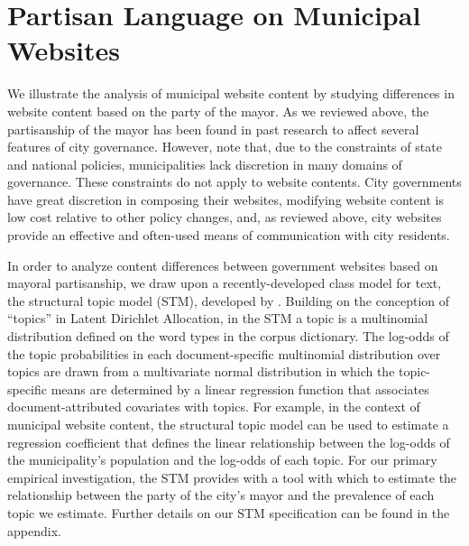 \documentclass[11pt]{article}
\begin{document}
\section{Partisan Language on Municipal Websites}

We illustrate the analysis of municipal website content by studying differences in website content based on the party of the mayor. As we reviewed above, the partisanship of the mayor has been found in past research to affect several features of city governance. However, \citet{gerber2011mayors} note that, due to the constraints of state and national policies, municipalities lack discretion in many domains of governance. These constraints do not apply to website contents. City governments have great discretion in composing their websites, modifying website content is low cost relative to other policy changes, and, as reviewed above, city websites provide an effective and often-used means of communication with city residents. 



%

In order to analyze content differences between government websites based on mayoral partisanship, we draw upon a recently-developed class model for text, the structural topic model (STM), developed by \citet{Roberts2014}. Building on the conception of ``topics'' in Latent Dirichlet Allocation, in the STM a topic is a multinomial distribution defined on the word types in the corpus dictionary. The log-odds of the topic probabilities in each document-specific multinomial distribution over topics are drawn from a multivariate normal distribution in which the topic-specific means are determined by a linear regression function that associates document-attributed covariates with topics. For example, in the context of municipal website content, the structural topic model can be used to estimate a regression coefficient that defines the linear relationship between the log-odds of the municipality's population and the log-odds of each topic. For our primary empirical investigation, the STM provides with a tool with which to estimate the relationship between the party of the city's mayor and the prevalence of each topic we estimate. Further details on our STM specification can be found in the appendix.
\end{document}
